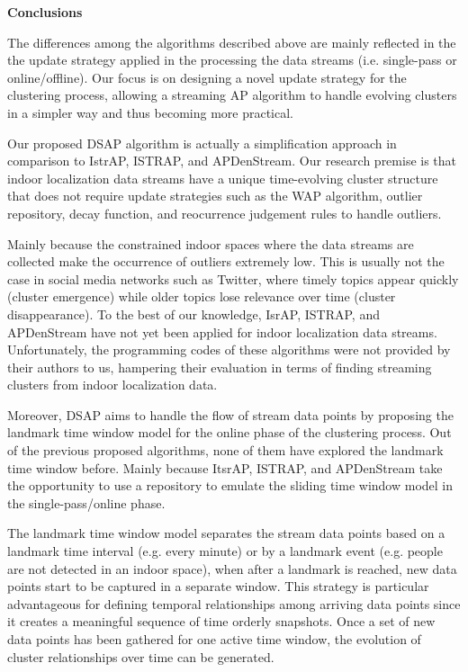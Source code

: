\textbf{Conclusions}

The differences among the algorithms described above are mainly reflected in the the update strategy applied in the processing the data streams (i.e. single-pass or online/offline). Our focus is on designing a novel update strategy for the clustering process, allowing a streaming AP algorithm to handle evolving clusters in a simpler way and thus becoming more practical. 

Our proposed DSAP algorithm is actually a simplification approach in comparison to IstrAP, ISTRAP, and APDenStream. Our research premise is that indoor localization data streams have a unique time-evolving cluster structure that does not require update strategies such as the WAP algorithm, outlier repository, decay function, and reocurrence judgement rules to handle outliers. 

Mainly because the constrained indoor spaces where the data streams are collected make the occurrence of outliers extremely low. This is usually not the case in social media networks such as Twitter, where timely topics appear quickly (cluster emergence) while older topics lose relevance over time (cluster disappearance). To the best of our knowledge, IsrAP, ISTRAP, and APDenStream have not yet been applied for indoor localization data streams. Unfortunately, the programming codes of these algorithms were not provided by their authors to us, hampering their evaluation in terms of finding streaming clusters from indoor localization data.

Moreover, DSAP aims to handle the flow of stream data points by proposing the landmark time window model for the online phase of the clustering process. Out of the previous proposed algorithms, none of them have explored the landmark time window before. Mainly because ItsrAP, ISTRAP, and APDenStream take the opportunity to use a repository to emulate the sliding time window model in the single-pass/online phase. 

The landmark time window model separates the stream data points based on a landmark time interval (e.g. every minute) or by a landmark event (e.g. people are not detected in an indoor space), when after a landmark is reached, new data points start to be captured in a separate window. This strategy is particular advantageous for defining temporal relationships among arriving data points since it creates a meaningful sequence of time orderly snapshots. Once a set of new data points has been gathered for one active time window, the evolution of cluster relationships over time can be generated. 

